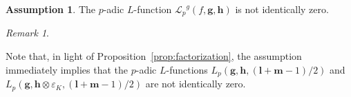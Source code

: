 \documentclass[a4paper,11pt]{amsart}
\theoremstyle{plain}
\theoremstyle{definition}
\newtheorem{ass}[theorem]{Assumption}
\theoremstyle{remark}
\newtheorem{remarkwr}[theorem]{Remark}
\newenvironment{remark}{\begin{remarkwr}\begin{upshape}}{\end{upshape}\end{remarkwr}}
\newcommand{\Lp}{{\mathscr{L}_p}}
\newcommand{\ord}{{\mathrm{ord}}}
\newcommand{\hf}{{\mathbf{f}}}
\newcommand{\hg}{{\mathbf{g}}}
\newcommand{\hh}{{\mathbf h}}
\numberwithin{equation}{section}
\begin{document}
\begin{ass}\label{ass:nonvanishing}
    The $p$-adic $L$-function $\Lp^g(f,\hg,\hh)$ is not identically zero.
\end{ass}

\begin{remark}
    Note that, in light of Proposition~\ref{prop:factorization}, the assumption immediately implies that the $p$-adic $L$-functions $L_p(\hg,\hh,(\mathbf{l}+\mathbf{m}-1)/2)$ and $L_p(\hg,\hh\otimes\varepsilon_K,(\mathbf{l}+\mathbf{m}-1)/2)$ are not identically zero.
\end{remark}

\end{document}

